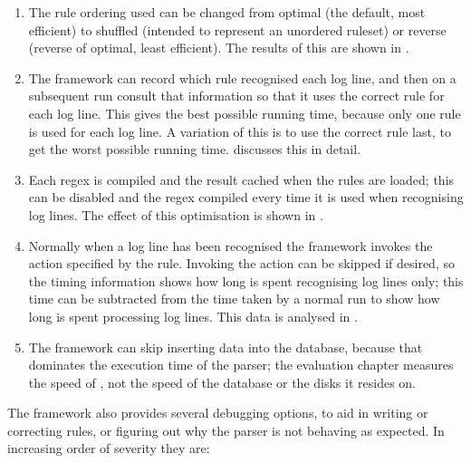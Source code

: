 \begin{enumerate}

    \item The rule ordering used can be changed from optimal (the default,
        most efficient) to shuffled (intended to represent an unordered
        ruleset) or reverse (reverse of optimal, least efficient).  The
        results of this are shown in .

    \item The framework can record which rule recognised each log line, and
        then on a subsequent run consult that information so that it uses
        the correct rule for each log line.  This gives the best possible
        running time, because only one rule is used for each log line.  A
        variation of this is to use the correct rule last, to get the worst
        possible running time.  
        discusses this in detail.

    \item Each regex is compiled and the result cached when the rules are
        loaded; this can be disabled and the regex compiled every time it
        is used when recognising log lines.  The effect of this
        optimisation is shown in .

    \item Normally when a log line has been recognised the framework
        invokes the action specified by the rule.  Invoking the action can
        be skipped if desired, so the timing information shows how long is
        spent recognising log lines only; this time can be subtracted from
        the time taken by a normal run to show how long is spent processing
        log lines.  This data is analysed in .

    \item The framework can skip inserting data into the database, because
        that dominates the execution time of the parser; the evaluation
        chapter measures the speed of \parsername{}, not the speed of the
        database or the disks it resides on.

\end{enumerate}

The framework also provides several debugging options, to aid in writing or
correcting rules, or figuring out why the parser is not behaving as
expected.  In increasing order of severity they are:

